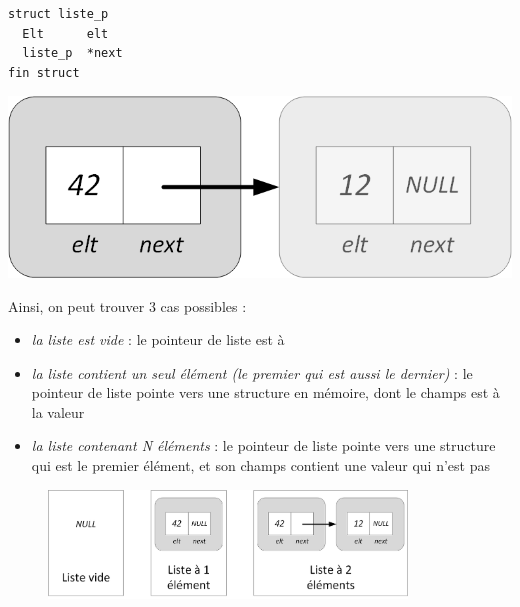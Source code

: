 \documentclass[11pt,a4paper]{article}
\begin{document}
\begin{table}[h!]
  \centering
  \begin{minipage}{0.4\textwidth}
    \centering
\begin{lstlisting}[style=algorithmique]
struct liste_p
  Elt      elt
  liste_p  *next
fin struct \end{lstlisting}
  \end{minipage}
  \hfillx
  \begin{minipage}{0.55\textwidth}
    \centering
\includegraphics[scale=0.75]{img/listes/Listes_Pointeurs_1_Structure_Detaillee.png}
  \end{minipage}
\end{table}

Ainsi, on peut trouver 3 cas possibles :
\begin{itemize}
\item \textit{la liste est vide} : le pointeur de liste est à 
\item \textit{la liste contient un seul élément (le premier qui est aussi le dernier)} : le pointeur de liste pointe vers une structure en mémoire, dont le champs  est à la valeur 
\item \textit{la liste contenant N éléments} : le pointeur de liste pointe vers une structure qui est le premier élément, et son champs  contient une valeur qui n'est pas 
\end{itemize}

\medskip

\begin{figure}[ht!]
\centering
\centerline{   %
\includegraphics[width=0.85\textwidth]{img/listes/Listes_Pointeurs_2_exemple1_espace.png}
}
\end{figure}
\end{document}
